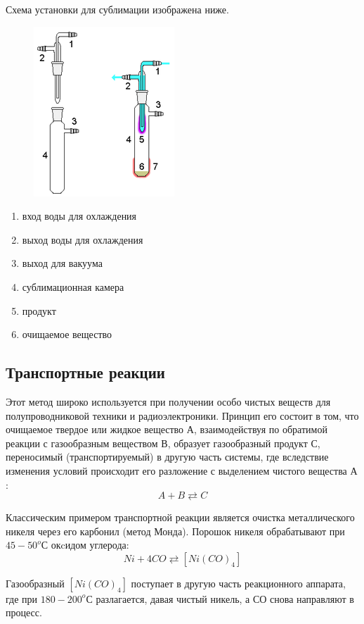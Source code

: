 \documentclass[14pt,a4paper]{scrartcl}
\begin{document}
Схема установки для сублимации изображена ниже.
\begin{figure}[H]
\centering
\includegraphics[scale=1.3]{sublimation2.png}
\caption{}
\label{}
\end{figure}

\begin{enumerate}
\item вход воды для охлаждения
\item выход воды для охлаждения
\item выход для вакуума
\item сублимационная камера
\item продукт
\item очищаемое вещество
\end{enumerate}


\subsection*{Транспортные реакции}
Этот метод широко используется при получении особо чистых веществ для полупроводниковой техники и радиоэлектроники. Принцип его состоит в том, что очищаемое твердое или жидкое вещество $А$, взаимодействуя по обратимой реакции с газообразным веществом $В$, образует газообразный продукт $С$, переносимый (транспортируемый) в другую часть системы, где вследствие изменения условий происходит его разложение с выделением чистого вещества $А$:
$$A + B \rightleftarrows C$$

Классическим примером транспортной реакции является очистка металлического никеля через его карбонил (метод Монда). Порошок никеля обрабатывают при $45-50 ^oС$ окcидом углерода:
$$Ni + 4CO \rightleftarrows \left[Ni(CO)_4\right]$$

Газообразный $[Ni(CO)_4]$ поступает в другую часть реакционного аппарата, где при $180-200 ^oС$ разлагается, давая чистый никель, а $СО$ снова направляют в процесс.
\end{document}
